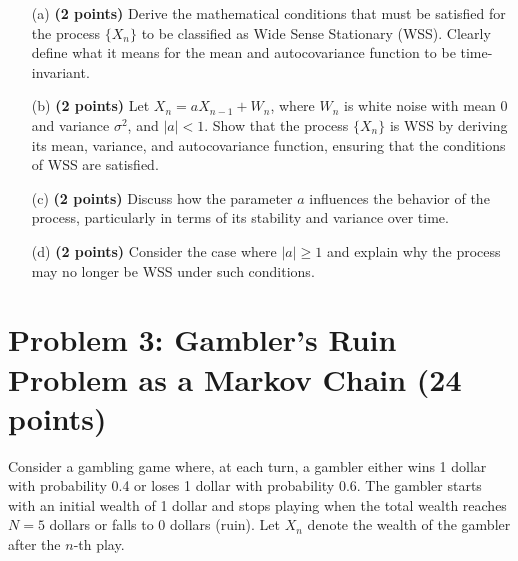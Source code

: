 \documentclass{article}
\begin{document}
\begin{itemize}
    \item[(a)] \textbf{(2 points)} Derive the mathematical conditions that must be satisfied for the process \( \{X_n\} \) to be classified as Wide Sense Stationary (WSS). Clearly define what it means for the mean and autocovariance function to be time-invariant.
    \item[(b)] \textbf{(2 points)} Let \( X_n = a X_{n-1} + W_n \), where \( W_n \) is white noise with mean 0 and variance \( \sigma^2 \), and \( |a| < 1 \). Show that the process \( \{X_n\} \) is WSS by deriving its mean, variance, and autocovariance function, ensuring that the conditions of WSS are satisfied.
    \item[(c)] \textbf{(2 points)} Discuss how the parameter \( a \) influences the behavior of the process, particularly in terms of its stability and variance over time.
    \item[(d)] \textbf{(2 points)} Consider the case where \( |a| \geq 1 \) and explain why the process may no longer be WSS under such conditions.
\end{itemize}



\section*{Problem 3: Gambler’s Ruin Problem as a Markov Chain (24 points)}

Consider a gambling game where, at each turn, a gambler either wins 1 dollar with probability 0.4 or loses 1 dollar with probability 0.6. The gambler starts with an initial wealth of 1 dollar and stops playing when the total wealth reaches \( N = 5 \) dollars or falls to 0 dollars (ruin). Let \( X_n \) denote the wealth of the gambler after the \( n \)-th play.
\end{document}
